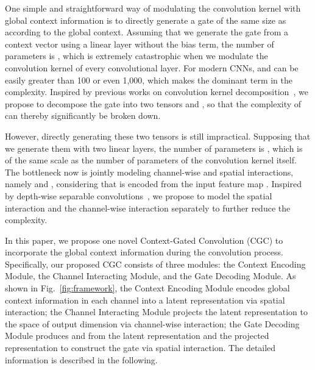 \documentclass[runningheads]{llncs}
\begin{document}
One simple and straightforward way of modulating the convolution kernel  with global context information is to directly generate a gate  of the same size as  according to the global context. Assuming that we generate the gate from a context vector  using a linear layer without the bias term, the number of parameters is , which is extremely catastrophic when we modulate the convolution kernel of every convolutional layer. For modern CNNs,  and  can be easily greater than 100 or even 1,000, which makes  the dominant term in the complexity. Inspired by previous works on convolution kernel decomposition~\cite{howard2017mobilenets,chollet2017xception}, we propose to decompose the gate  into two tensors  and , so that the complexity of  can thereby significantly be broken down.

However, directly generating these two tensors is still impractical. Supposing that we generate them with two linear layers, the number of parameters is , which is of the same scale as the number of parameters of the convolution kernel itself. The bottleneck now is jointly modeling channel-wise and spatial interactions, namely  and , considering that  is encoded from the input feature map . Inspired by depth-wise separable convolutions~\cite{howard2017mobilenets,chollet2017xception}, we propose to model the spatial interaction and the channel-wise interaction separately to further reduce the complexity. 

In this paper, we propose one novel Context-Gated Convolution (CGC) to incorporate the global context information during the convolution process. Specifically, our proposed CGC consists of three modules: the Context Encoding Module, the Channel Interacting Module, and the Gate Decoding Module. As shown in Fig.~\ref{fig:framework}, the Context Encoding Module encodes global context information in each channel into a latent representation  via spatial interaction; the Channel Interacting Module projects the latent representation to the space of output dimension  via channel-wise interaction; the Gate Decoding Module produces  and  from the latent representation  and the projected representation  to construct the gate  via spatial interaction. The detailed information is described in the following.
\end{document}

